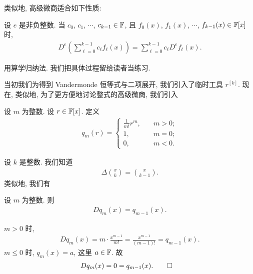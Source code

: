 类似地, 高级微商适合如下性质:

\begin{proposition}
    设 $e$ 是非负整数. 当 $c_0$, $c_1$, $\cdots$, $c_{k-1} \in \mathbb{F}$, 且 $f_0 (x)$, $f_1 (x)$, $\cdots$, $f_{k-1} (x) \in \mathbb{F}[x]$ 时,
    \begin{align*}
        D^e \left( \sum_{\ell = 0}^{k-1} c_\ell f_\ell (x) \right)
        = \sum_{\ell = 0}^{k-1} c_\ell D^e f_\ell (x).
    \end{align*}
\end{proposition}

\begin{pf}
    用算学归纳法. 我们把具体过程留给读者当练习.
\end{pf}

当初我们为得到 Vandermonde 恒等式与二项展开, 我们引入了临时工具 $r^{[k]}$. 现在, 类似地, 为了更方便地讨论整式的高级微商, 我们引入

\begin{definition}
    设 $m$ 为整数. 设 $r \in \mathbb{F}[x]$. 定义
    \begin{align*}
        q_m (r) = \begin{cases}
            \frac{1}{m!} r^m, & \quad m > 0; \\
            1,                & \quad m = 0; \\
            0,                & \quad m < 0.
        \end{cases}
    \end{align*}
\end{definition}

设 $k$ 是整数. 我们知道
\begin{align*}
    \Delta \binom{x}{k} = \binom{x}{k - 1}.
\end{align*}
类似地, 我们有

\begin{proposition}
    设 $m$ 为整数. 则
    \begin{align*}
        D q_m (x) = q_{m-1} (x).
    \end{align*}
\end{proposition}

\begin{pf}
    $m > 0$ 时,
    \begin{align*}
        D q_m (x) = m \cdot \frac{x^{m-1}}{m!} = \frac{x^{m-1}}{(m-1)!} = q_{m-1} (x).
    \end{align*}
    $m \leq 0$ 时, $q_m (x) = a$, 这里 $a \in \mathbb{F}$. 故
    \begin{align*}
         & D q_m (x) = 0 = q_{m-1} (x). \qedhere
    \end{align*}
\end{pf}

